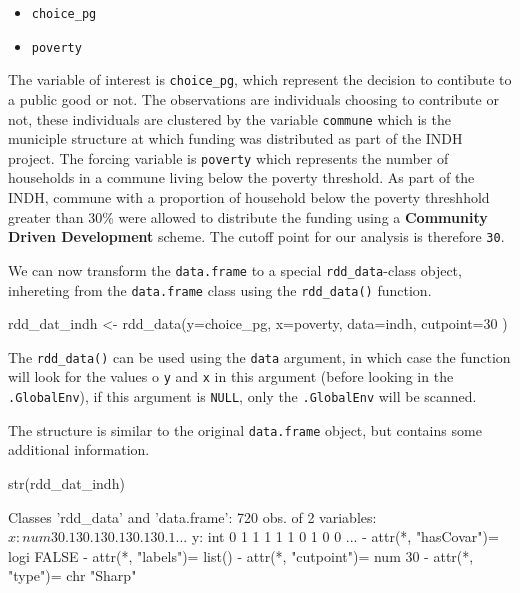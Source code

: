\documentclass[article]{jss}
\begin{document}
\begin{itemize}
\itemsep1pt\parskip0pt
\item
  \texttt{choice\_pg}
\item
  \texttt{poverty}
\end{itemize}

The variable of interest is \texttt{choice\_pg}, which represent the
decision to contibute to a public good or not. The observations are
individuals choosing to contribute or not, these individuals are
clustered by the variable \texttt{commune} which is the municiple
structure at which funding was distributed as part of the INDH project.
The forcing variable is \texttt{poverty} which represents the number of
households in a commune living below the poverty threshold. As part of
the INDH, commune with a proportion of household below the poverty
threshhold greater than 30\% were allowed to distribute the funding
using a \textbf{Community Driven Development} scheme. The cutoff point
for our analysis is therefore \texttt{30}.

We can now transform the \texttt{data.frame} to a special
\texttt{rdd\_data}-class object, inhereting from the \texttt{data.frame}
class using the \texttt{rdd\_data()} function.

\begin{CodeChunk}
\begin{CodeInput}
rdd_dat_indh <- rdd_data(y=choice_pg,
                         x=poverty,
                         data=indh,
                         cutpoint=30 )
\end{CodeInput}
\end{CodeChunk}

The \texttt{rdd\_data()} can be used using the \texttt{data} argument,
in which case the function will look for the values o \texttt{y} and
\texttt{x} in this argument (before looking in the \texttt{.GlobalEnv}),
if this argument is \texttt{NULL}, only the \texttt{.GlobalEnv} will be
scanned.

The structure is similar to the original \texttt{data.frame} object, but
contains some additional information.

\begin{CodeChunk}
\begin{CodeInput}
str(rdd_dat_indh)
\end{CodeInput}
\begin{CodeOutput}
Classes 'rdd_data' and 'data.frame':    720 obs. of  2 variables:
 $ x: num  30.1 30.1 30.1 30.1 30.1 ...
 $ y: int  0 1 1 1 1 1 0 1 0 0 ...
 - attr(*, "hasCovar")= logi FALSE
 - attr(*, "labels")= list()
 - attr(*, "cutpoint")= num 30
 - attr(*, "type")= chr "Sharp"
\end{CodeOutput}
\end{CodeChunk}
\end{document}
